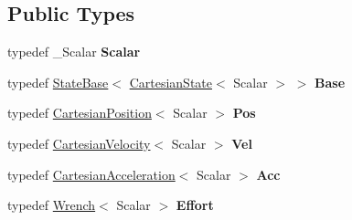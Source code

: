 \subsection*{Public Types}
\begin{DoxyCompactItemize}
\item 
typedef \+\_\+\+Scalar {\bfseries Scalar}\hypertarget{classow__core_1_1CartesianState_acc5cc577ffb21c45ad439b989272c15c}{}\label{classow__core_1_1CartesianState_acc5cc577ffb21c45ad439b989272c15c}

\item 
typedef \hyperlink{classow__core_1_1StateBase}{State\+Base}$<$ \hyperlink{classow__core_1_1CartesianState}{Cartesian\+State}$<$ Scalar $>$ $>$ {\bfseries Base}\hypertarget{classow__core_1_1CartesianState_a54744b38e43a0930b4c6987cdb36d716}{}\label{classow__core_1_1CartesianState_a54744b38e43a0930b4c6987cdb36d716}

\item 
typedef \hyperlink{classow__core_1_1CartesianPosition}{Cartesian\+Position}$<$ Scalar $>$ {\bfseries Pos}\hypertarget{classow__core_1_1CartesianState_a1fee95dce7b56af8614390769dd1e661}{}\label{classow__core_1_1CartesianState_a1fee95dce7b56af8614390769dd1e661}

\item 
typedef \hyperlink{classow__core_1_1CartesianVelocity}{Cartesian\+Velocity}$<$ Scalar $>$ {\bfseries Vel}\hypertarget{classow__core_1_1CartesianState_a418a6e9a558fa936f2ce07b3997a422c}{}\label{classow__core_1_1CartesianState_a418a6e9a558fa936f2ce07b3997a422c}

\item 
typedef \hyperlink{classow__core_1_1CartesianAcceleration}{Cartesian\+Acceleration}$<$ Scalar $>$ {\bfseries Acc}\hypertarget{classow__core_1_1CartesianState_aaeb96ae38e8a9c024b324deeca77091a}{}\label{classow__core_1_1CartesianState_aaeb96ae38e8a9c024b324deeca77091a}

\item 
typedef \hyperlink{classow__core_1_1Wrench}{Wrench}$<$ Scalar $>$ {\bfseries Effort}\hypertarget{classow__core_1_1CartesianState_af34d98a159f1d3ab835ec38d936efcfd}{}\label{classow__core_1_1CartesianState_af34d98a159f1d3ab835ec38d936efcfd}

\end{DoxyCompactItemize}
